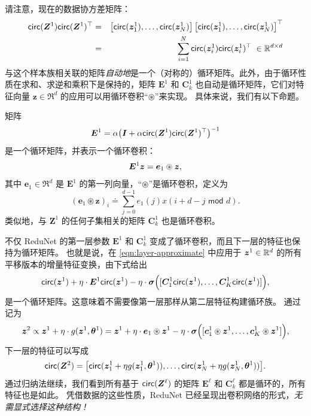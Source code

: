 \documentclass[../../book-main.tex]{subfiles}
\begin{document}
请注意，现在的数据协方差矩阵：
\begin{eqnarray}
\mathsf{circ}(\bm Z^1) \mathsf{circ}(\bm Z^1)^\top
&=& \left[ \mathsf{circ}(\bm{z}_{1}^1), \dots, \mathsf{circ}(\bm{z}_{N}^1) \right] \left[ \mathsf{circ}(\bm{z}_{1}^1), \dots, \mathsf{circ} (\bm{z}_{N}^1) \right]^\top \nonumber \\
&=& \sum_{i =1}^N \mathsf{circ}(\bm{z}_{i}^1) \mathsf{circ}(\bm{z}_{i}^1)^\top \;\in \mathbb{R}^{d\times d}
\end{eqnarray}
与这个样本族相关联的矩阵{\em 自动地}是一个（对称的）循环矩阵。此外，由于循环性质在求和、求逆和乘积下是保持的，矩阵 $\bm E^1$ 和 $\bm C^1_k$ 也自动是循环矩阵，它们对特征向量 $\bm z \in \Re^d$ 的应用可以用循环卷积“$\circledast$”来实现。
具体来说，我们有以下命题。

\begin{proposition}[$\bm E^1$ 和 $\bm C^1_k$ 的卷积结构]
矩阵
\begin{equation}
    \bm E^1 = \alpha\big(\bm I + \alpha \mathsf{circ}(\bm Z^1) \mathsf{circ}(\bm Z^1)^\top \big)^{-1}
\end{equation}
是一个循环矩阵，并表示一个循环卷积：
$$\bm E^1 \bm{z} = \bm e_1 \circledast \bm{z},$$
其中 $\bm e_1 \in \Re^d$ 是 $\bm E^1$ 的第一列向量，“$\circledast$”是循环卷积，定义为
\begin{equation*}
    (\bm e_1 \circledast \bm z)_{i} \doteq \sum_{j=0}^{d-1} e_1(j) x(i+ d-j \,\, \textsf{mod} \,\,d).
\end{equation*}
类似地，与 $\bm Z^1$ 的任何子集相关的矩阵 $\bm C^1_k$ 也是循环卷积。
\label{prop:circular-conv-1}
\end{proposition}

不仅 ReduNet 的第一层参数 $\bm E^1$ 和 $\bm{C}^1_k$ 变成了循环卷积，而且下一层的特征也保持为循环矩阵。
也就是说，在 \eqref{eqn:layer-approximate} 中应用于 $\bm{z}^1 \in \mathbb{R}^d$ 的所有平移版本的增量特征变换，由下式给出
\begin{equation}
    \mathsf{circ}(\bm{z}^1) + \eta \cdot \bm E^1 \mathsf{circ}(\bm{z}^1) - \eta \cdot \bm \sigma \Big([\bm{C}_1^1 \mathsf{circ}(\bm{z}^1), \ldots, \bm{C}^1_K \mathsf{circ}(\bm{z}^1)] \Big),
\end{equation}
是一个循环矩阵。这意味着不需要像第一层那样从第二层特征构建循环族。
通过记为
\begin{equation}
\bm{z}^{2} \propto \bm{z}^{1} +\eta \cdot g(\bm{z}^{1}, \bm \theta^{1}) =  \bm{z}^1 + \eta \cdot \bm e_{1} \circledast \bm{z}^{1} -  \eta \cdot \bm \sigma\Big([\bm{c}_{1}^{1} \circledast \bm{z}^{1}, \dots, \bm{c}^{1}_{K} \circledast \bm{z}^{1}]\Big),
\label{eqn:approximate-convolution}
\end{equation}
下一层的特征可以写成
$$\mathsf{circ}(\bm Z^2) = \big[ \mathsf{circ}( \bm z_{1}^1 + \eta g( \bm z_{1}^1, \bm \theta^1)), \dots, \mathsf{circ}( \bm z_{N}^1 + \eta g(\bm z_{N}^1, \bm \theta^1)) \big].$$
通过归纳法继续，我们看到所有基于 $\mathsf{circ}(\bm Z^\ell)$ 的矩阵 $\bm E^\ell$ 和 $\bm C^\ell_k$ 都是循环的，所有特征也是如此。
凭借数据的这些性质，ReduNet 已经呈现出卷积网络的形式，{\em 无需显式选择这种结构！}
\end{document}
